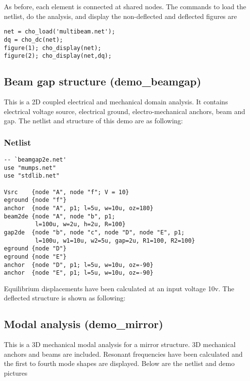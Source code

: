 As before, each element is connected at shared nodes.
The commands to load the netlist, do the analysis, and 
display the non-deflected and deflected figures are 

\begin{verbatim}
net = cho_load('multibeam.net'); 
dq = cho_dc(net); 
figure(1); cho_display(net);  
figure(2); cho_display(net,dq); 
\end{verbatim} 

 
\subsection{Beam gap structure (demo\_beamgap)}

This is a 2D coupled electrical and mechanical domain analysis. It contains
electrical voltage source, electrical ground, electro-mechanical anchors, beam
and gap. The netlist and structure of this demo are as following: 

\subsubsection*{Netlist}

\begin{verbatim}
-- `beamgap2e.net' 
use "mumps.net"
use "stdlib.net"

Vsrc    {node "A", node "f"; V = 10}
eground {node "f"}
anchor  {node "A", p1; l=5u, w=10u, oz=180}
beam2de {node "A", node "b", p1; 
         l=100u, w=2u, h=2u, R=100}
gap2de  {node "b", node "c", node "D", node "E", p1;
         l=100u, w1=10u, w2=5u, gap=2u, R1=100, R2=100}
eground {node "D"}
eground {node "E"}
anchor  {node "D", p1; l=5u, w=10u, oz=-90}
anchor  {node "E", p1; l=5u, w=10u, oz=-90}
\end{verbatim}


Equilibrium displacements have been calculated at an input voltage 10v. The
deflected structure is shown as following: 
                                                                                         
\subsection{Modal analysis (demo\_mirror)}

This is a 3D mechanical modal analysis for a mirror structure. 3D mechanical
anchors and beams are included. Resonant frequencies have been calculated and
the first to fourth mode shapes are displayed. Below are the netlist and demo
pictures  

